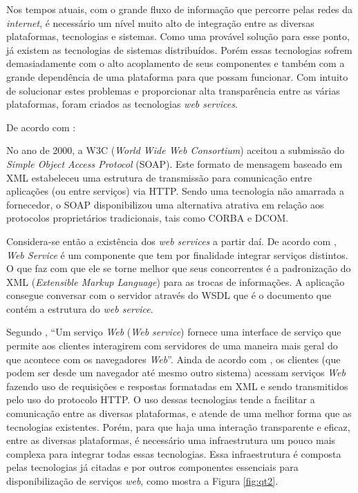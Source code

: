 	
	\par Nos tempos atuais, com o grande fluxo de informação que percorre pelas
redes da \textit{internet}, é necessário um nível muito alto de integração entre
as diversas plataformas, tecnologias e sistemas. Como uma provável solução para
esse ponto, já existem as tecnologias de sistemas distribuídos. Porém essas
tecnologias sofrem demasiadamente com o alto acoplamento de seus componentes e
também com a grande dependência de uma plataforma para que possam funcionar. Com
intuito de solucionar estes problemas e proporcionar alta transparência entre
as várias plataformas, foram criados as tecnologias \textit{web services}.
	
	
	\par De acordo com :
	\begin{citacao}
		No ano de 2000, a W3C (\textit{World Wide Web Consortium}) aceitou a submissão
		do \textit{Simple Object Access Protocol} (SOAP). Este formato de mensagem
		baseado em XML estabeleceu uma estrutura de transmissão para comunicação entre
		aplicações (ou entre serviços) via HTTP. Sendo uma tecnologia não amarrada a
		fornecedor, o SOAP disponibilizou uma alternativa atrativa em relação aos
		protocolos proprietários tradicionais, tais como CORBA e DCOM.
	\end{citacao}
	
	\par Considera-se então a existência dos \textit{web services} a partir daí. De
acordo com , \textit{Web Service} é um componente que
tem por finalidade integrar serviços distintos. O que faz com que ele se torne
melhor que seus concorrentes é a padronização do XML (\textit{Extensible Markup
Language}) para as trocas de informações. A aplicação consegue conversar com o
servidor através do  WSDL que é o documento que contém a estrutura do 
\textit{web service}.
	
	\par Segundo , “Um serviço \textit{Web} (\textit{Web
service}) fornece uma interface de serviço que permite aos clientes interagirem
com servidores de uma maneira mais geral do que acontece com os navegadores
\textit{Web}”. Ainda de acordo com , os clientes (que
podem ser desde um navegador até mesmo outro sistema) acessam serviços 
\textit{Web} fazendo uso de requisições e respostas formatadas em XML e sendo
transmitidos pelo uso do protocolo HTTP. O uso dessas tecnologias tende a
facilitar a comunicação entre as diversas plataformas, e atende de uma
melhor forma que as tecnologias existentes. Porém, para que haja uma
interação transparente e eficaz, entre as diversas plataformas, é necessário uma
infraestrutura um pouco mais complexa para integrar todas essas tecnologias.
Essa infraestrutura é composta pelas tecnologias já citadas e por outros
componentes essenciais para disponibilização de serviços \textit{web}, como
mostra a Figura \ref{fig:qt2}.

